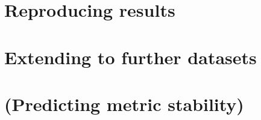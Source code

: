 \section{Reproducing results}


\section{Extending to further datasets}


\section{(Predicting metric stability)}